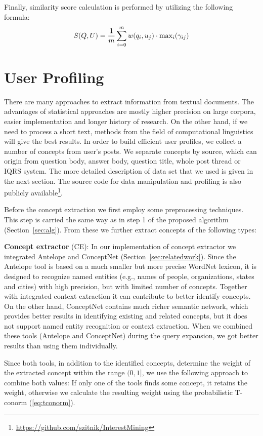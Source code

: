 \documentclass[conference]{IEEEtran}
\newcommand{\secref}[1]{Section~\ref{#1}}
\begin{document}
Finally, similarity score calculation is performed by utilizing the following formula:
\begin{equation}
	\label{eq:s}
	S(Q,U) = \frac{1}{m} \sum_{i=0}^{m} w(q_i,u_j) \cdot {\rm max}_i(\gamma_{ij})
\end{equation}




\section{User Profiling}
\label{sec:userprofiling}
There are many approaches to extract information from textual documents. The advantages of statistical approaches are mostly higher precision on large corpora, easier implementation and longer history of research. On the other hand, if we need to process a short text, methods from the field of computational linguistics will give the best results. In order to build efficient user profiles, we collect a number of concepts from user's posts. We separate concepts by source, which can origin from question body, answer body, question title, whole post thread or IQRS system. The more detailed description of data set that we used is given in the next section. The source code for data manipulation and profiling is also publicly available\footnote{\url{https://github.com/szitnik/InterestMining}}. 

Before the concept extraction we first employ some preprocessing techniques. This step is carried the same way as in step 1 of the proposed algorithm (\secref{sec:alg}). From these we further extract concepts of the following types:

{\bf Concept extractor} (CE):
In our implementation of concept extractor we integrated Antelope and ConceptNet (\secref{sec:relatedwork}). Since the Antelope tool is based on a much smaller but more precise WordNet lexicon, it is designed to recognize named entities (e.g., names of people, organizations, states and cities) with high precision, but with limited number of concepts. Together with integrated context extraction it can contribute to better identify concepts. On the other hand, ConceptNet contains much richer semantic network, which provides better results in identifying existing and related concepts, but it does not support named entity recognition or context extraction. When we combined these tools (Antelope and ConceptNet) during the query expansion, we got better results than using them individually.

Since both tools, in addition to the identified concepts, determine the weight of the extracted concept within the range $(0,1]$, we use the following approach to combine both values: If only one of the tools finds some concept, it retains the weight, otherwise we calculate the resulting weight using the probabilistic T-conorm (\ref{eq:tconorm}). 
\end{document}
